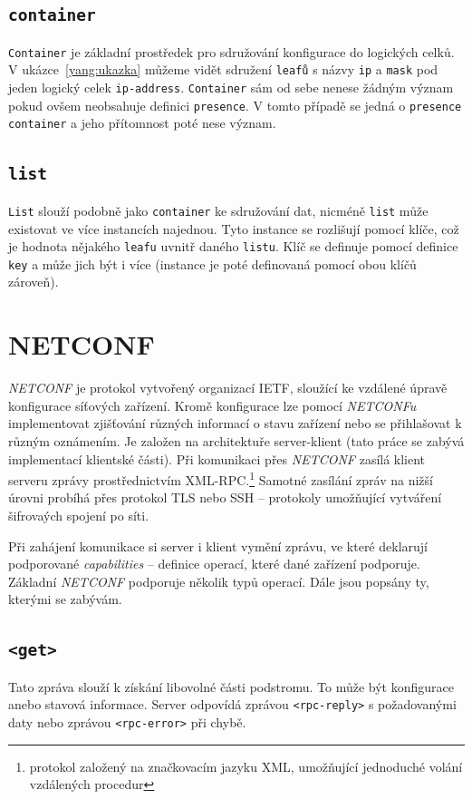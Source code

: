 \documentclass[thesis=B,czech,hidelinks]{FITthesis}[2019/03/06]
\begin{document}
\subsection{\texttt{container}}
\texttt{Container} je základní prostředek pro sdružování konfigurace do logických celků. V ukázce~\ref{yang:ukazka} můžeme vidět sdružení \texttt{leafů} s názvy \texttt{ip} a \texttt{mask} pod jeden logický celek \texttt{ip-address}. \texttt{Container} sám od sebe nenese žádným význam pokud ovšem neobsahuje definici \texttt{presence}. V tomto případě se jedná o \texttt{presence container} a jeho přítomnost poté nese význam.
\subsection{\texttt{list}}
\texttt{List} slouží podobně jako \texttt{container} ke sdružování dat, nicméně \texttt{list} může existovat ve více instancích najednou. Tyto instance se rozlišují pomocí klíče, což je hodnota nějakého \texttt{leafu} uvnitř daného \texttt{listu}. Klíč se definuje pomocí definice \texttt{key} a může jich být i více (instance je poté definovaná pomocí obou klíčů zároveň).


\section{NETCONF}
\textit{NETCONF} je protokol vytvořený organizací IETF, sloužící ke vzdálené úpravě konfigurace síťových zařízení. Kromě konfigurace lze pomocí \textit{NETCONFu} implementovat zjišťování různých informací o stavu zařízení nebo se přihlašovat k různým oznámením. Je založen na architektuře server-klient (tato práce se zabývá implementací klientské části). Při komunikaci přes \textit{NETCONF} zasílá klient serveru zprávy prostřednictvím XML-RPC.\footnote{protokol založený na značkovacím jazyku XML, umožňující jednoduché volání vzdálených procedur} Samotné zasílání zpráv na nižší úrovni probíhá přes protokol TLS nebo SSH -- protokoly umožňující vytváření šifrovaých spojení po síti.

Při zahájení komunikace si server i klient vymění  zprávu, ve které deklarují podporované \textit{capabilities} -- definice operací, které dané zařízení podporuje. Základní \textit{NETCONF} podporuje několik typů operací. Dále jsou popsány ty, kterými se zabývám.

\subsection{\texttt{<get>}}
Tato zpráva slouží k získání libovolné části podstromu. To může být konfigurace anebo stavová informace. Server odpovídá zprávou \texttt{<rpc-reply>} s požadovanými daty nebo zprávou \texttt{<rpc-error>} při chybě.
\end{document}
